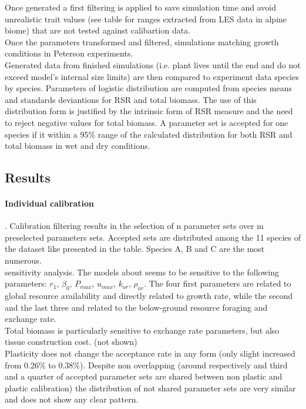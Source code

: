 Once generated a first filtering is applied to save simulation time and avoid unrealistic trait values (see table for ranges extracted from LES data in alpine biome) that are not tested against calibartion data.\\
Once the parameters transformed and filtered, simulations matching growth conditions in Peterson experiments.\\
Generated data from finished simulations (i.e. plant lives until the end and do not exceed model's internal size limits) are then compared to experiment data species by species. Parameters of logistic distribution are computed from species means and standards deviantions for RSR and total biomass. The use of this distribution form is justified by the intrinsic form of RSR measure and the need to reject negative values for total biomass. A parameter set is accepted for one species if it within a 95\% range of the calculated distribution for both RSR and total biomass in wet and dry conditions.\\



\subsection{Results}


\paragraph{Individual calibration}. Calibration filtering results in the selection of n parameter sets over m preselected parameters sets. Accepted sets are distributed among the 11 species of the dataset like presented in the table. Species A, B and C are the most numerous.\\
sensitivity analysis. The models about seems to be sensitive to the following parameters: $r_1$, $\beta_0$, $P_{max}$, $u_{max}$, $k_{or}$, $\rho_{ar}$. The four first parameters are related to global resource availability and directly related to growth rate, while the second and the last three and related to the below-ground resource foraging and exchange rate.\\
Total biomass is particularly sensitive to exchange rate parameters, but also tissue construction cost. (not shown)\\

Plasticity does not change the acceptance rate in any form (only slight increased from 0.26\% to 0.38\%). Despite non overlapping (around respectively and third and a quarter of accepted parameter sets are shared between non plastic and plastic calibration) the distribution of not shared parameter sets are very similar and does not show any clear pattern. \\

